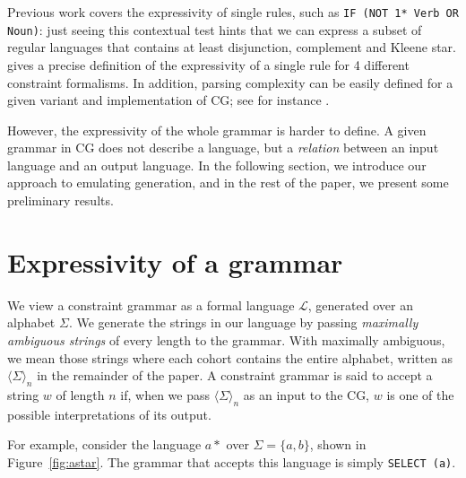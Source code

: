\documentclass[11pt]{article}
\def\t#1{\texttt{#1}}
\begin{document}
Previous work covers the expressivity of single rules, such as \texttt{IF (NOT 1* Verb OR Noun)}: just seeing this contextual test hints that we can express a subset of regular languages that contains at least disjunction, complement and Kleene star. 
 gives a precise definition of the expressivity of a single rule for 4 different constraint formalisms. In addition, parsing complexity can be easily defined for a given variant and implementation of CG; see for instance .

However, the expressivity of the whole grammar is harder to define. 
A given grammar in CG does not describe a language, but a \emph{relation} between an input language and an output language. 
In the following section, we introduce our approach to emulating generation, and in the rest of the paper, we present some preliminary results.

\section{Expressivity of a grammar}

We view a constraint grammar as a formal language $\mathcal{L}$, generated over an 
alphabet $\Sigma$. We generate the strings in our language by passing 
\emph{maximally ambiguous strings} of every length to the grammar. 
With maximally ambiguous, we mean those strings where each cohort contains the 
entire alphabet, written as $\langle \Sigma \rangle_n$ in the remainder of the paper. 
A constraint grammar is said to accept a string $w$ of length $n$ if, 
when we pass $\langle \Sigma \rangle_n$ as an input to the CG,
$w$ is one of the possible interpretations of its output.

For example, consider the language $a*$ over $\Sigma = \{a,b\}$,
shown in Figure~\ref{fig:astar}.
The grammar that accepts this language is simply \texttt{SELECT (a)}.

\def\wwf{~~~~\t{"<w>"}}
\def\alm{\t{"a"}~~~~~~}
\def\blm{\t{"b"}~~~~~~}
\end{document}
